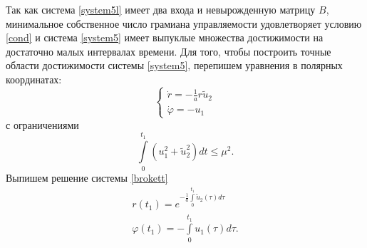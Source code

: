 \documentclass[../main.tex]{subfiles}
\begin{document}
 Так как система \eqref{system5l} имеет два входа и невырожденную матрицу $ B $, минимальное собственное число грамиана управляемости удовлетворяет условию \eqref{cond} и система \eqref{system5} имеет выпуклые множества достижимости на достаточно малых интервалах времени. 
 Для того, чтобы построить точные области достижимости системы  \eqref{system5}, перепишем уравнения в полярных координатах:
 \begin{equation}\label{brokett}
	 \left\{ {\begin{array}{*{20}{c}}
			 {\dot r =  - \frac{1}{a}r{\tilde u_2}}\\
			 {\dot \varphi  =  - {u_1}}
	 \end{array}} \right.
 \end{equation}
 с ограничениями
 \begin{equation*}
	 \int \limits_0^{t_1} \left( u_1^2 + \tilde{u}_2^2\right) dt \leq \mu^2.
 \end{equation*}
 Выпишем решение системы \eqref{brokett}
 \begin{equation*}
	 \begin{array}{l}
		 r({t_1}) = {e^{ - \frac{1}{a}\int\limits_0^{{t_1}} {{{\tilde u}_2}} (\tau )d\tau }}\\
		 \varphi ({t_1}) =  - \int\limits_0^{{t_1}} {{u_1}} (\tau )d\tau. 
	 \end{array}
 \end{equation*}
\end{document}
